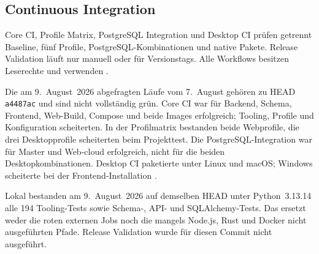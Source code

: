 \subsection{Continuous Integration}
\label{subsec:continuous-integration}

Core CI, Profile Matrix, PostgreSQL Integration und Desktop CI prüfen getrennt
Baseline, fünf Profile, PostgreSQL-Kombinationen und native Pakete. Release
Validation läuft nur manuell oder für Versionstags. Alle Workflows besitzen
Leserechte und verwenden 
\parencite{kleiveist2026ci}.

Die am 9.~August~2026 abgefragten Läufe vom 7.~August gehören zu HEAD
\texttt{a4487ac} und sind nicht vollständig grün. Core CI war für Backend,
Schema, Frontend, Web-Build, Compose und beide Images erfolgreich; Tooling,
Profile und Konfiguration scheiterten. In der Profilmatrix bestanden beide
Webprofile, die drei Desktopprofile scheiterten beim Projekttest. Die
PostgreSQL-Integration war für Master und Web-cloud erfolgreich, nicht für die
beiden Desktopkombinationen. Desktop CI paketierte unter Linux und macOS;
Windows scheiterte bei der
Frontend-Installation
\parencite{kleiveist2026ci-core-run,kleiveist2026ci-profiles-run,kleiveist2026ci-postgres-run,kleiveist2026ci-desktop-run}.

Lokal bestanden am 9.~August~2026 auf demselben HEAD unter Python~3.13.14 alle
194 Tooling-Tests sowie Schema-, API- und SQLAlchemy-Tests. Das ersetzt weder
die roten externen Jobs noch die mangels Node.js, Rust und Docker nicht
ausgeführten Pfade. Release Validation wurde für diesen Commit nicht
ausgeführt.
